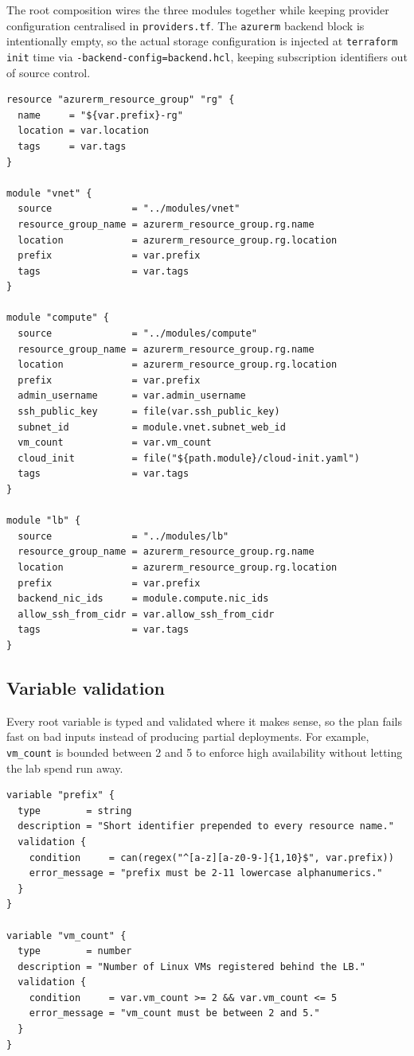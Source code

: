 \documentclass[10pt,a4paper,twocolumn]{article}
\begin{document}
The root composition wires the three modules together while keeping
provider configuration centralised in \texttt{providers.tf}. The
\texttt{azurerm} backend block is intentionally empty, so the actual
storage configuration is injected at \texttt{terraform init} time via
\texttt{-backend-config=backend.hcl}, keeping subscription identifiers
out of source control.

\begin{lstlisting}[style=hclcode, caption={Root composition (\texttt{infra/main.tf}) wiring the three modules}]
resource "azurerm_resource_group" "rg" {
  name     = "${var.prefix}-rg"
  location = var.location
  tags     = var.tags
}

module "vnet" {
  source              = "../modules/vnet"
  resource_group_name = azurerm_resource_group.rg.name
  location            = azurerm_resource_group.rg.location
  prefix              = var.prefix
  tags                = var.tags
}

module "compute" {
  source              = "../modules/compute"
  resource_group_name = azurerm_resource_group.rg.name
  location            = azurerm_resource_group.rg.location
  prefix              = var.prefix
  admin_username      = var.admin_username
  ssh_public_key      = file(var.ssh_public_key)
  subnet_id           = module.vnet.subnet_web_id
  vm_count            = var.vm_count
  cloud_init          = file("${path.module}/cloud-init.yaml")
  tags                = var.tags
}

module "lb" {
  source              = "../modules/lb"
  resource_group_name = azurerm_resource_group.rg.name
  location            = azurerm_resource_group.rg.location
  prefix              = var.prefix
  backend_nic_ids     = module.compute.nic_ids
  allow_ssh_from_cidr = var.allow_ssh_from_cidr
  tags                = var.tags
}
\end{lstlisting}

\subsection{Variable validation}

Every root variable is typed and validated where it makes sense, so the
plan fails fast on bad inputs instead of producing partial deployments.
For example, \texttt{vm\_count} is bounded between 2 and 5 to enforce
high availability without letting the lab spend run away.

\begin{lstlisting}[style=hclcode, caption={Validated input variables (excerpt of \texttt{infra/variables.tf})}]
variable "prefix" {
  type        = string
  description = "Short identifier prepended to every resource name."
  validation {
    condition     = can(regex("^[a-z][a-z0-9-]{1,10}$", var.prefix))
    error_message = "prefix must be 2-11 lowercase alphanumerics."
  }
}

variable "vm_count" {
  type        = number
  description = "Number of Linux VMs registered behind the LB."
  validation {
    condition     = var.vm_count >= 2 && var.vm_count <= 5
    error_message = "vm_count must be between 2 and 5."
  }
}
\end{lstlisting}
\end{document}
